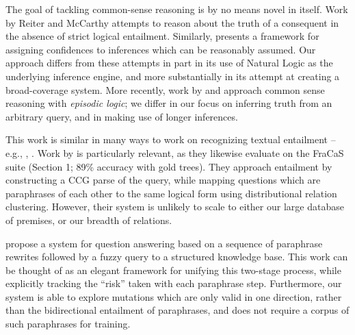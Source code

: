 The goal of tackling common-sense reasoning is by no means novel in
  itself.
Work by Reiter and McCarthy \cite{key:1980reiter-logic,key:1980mccarthy-circumscription}
  attempts to reason about the truth of a consequent
  in the absence of strict logical entailment.
Similarly,  presents a framework for
  assigning confidences to inferences which can be reasonably assumed.
Our approach differs from these attempts in part in its use of Natural Logic
  as the underlying inference engine, and more substantially in its
  attempt at creating a broad-coverage system.
More recently, work by  and
   approach common sense reasoning
  with \textit{episodic logic}; we differ in our focus on inferring
  truth from an arbitrary query, and in making use of longer inferences.

This work is similar in many ways to work on 
  recognizing textual entailment -- e.g., 
  , .
Work by  is particularly relevant,
  as they likewise evaluate on the FraCaS suite (Section 1;
  89\% accuracy with gold trees).
They approach entailment by constructing a CCG parse of the query,
  while mapping questions which are paraphrases of each other to the
  same logical form using distributional relation clustering.
However, their system is unlikely to scale to either our large
  database of premises, or our breadth of relations.

 propose a system for question answering
  based on a sequence of paraphrase rewrites followed by a fuzzy query to
  a structured knowledge base.
This work can be thought of as an elegant framework for unifying this
  two-stage process, while explicitly tracking the ``risk'' taken with
  each paraphrase step.
Furthermore, our system is able to explore mutations which are only
  valid in one direction, rather than the bidirectional entailment of
  paraphrases, and does not require a corpus of such paraphrases for
  training.
  

